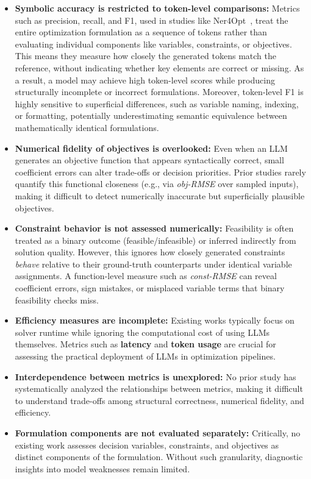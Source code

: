 \documentclass[review,12pt]{elsarticle}
\begin{document}
\begin{itemize}
    \item \textbf{Symbolic accuracy is restricted to token-level comparisons:} Metrics such as precision, recall, and F1, used in studies like Ner4Opt~\cite{kadiouglu2024ner4opt}, treat the entire optimization formulation as a sequence of tokens rather than evaluating individual components like variables, constraints, or objectives. This means they measure how closely the generated tokens match the reference, without indicating whether key elements are correct or missing. As a result, a model may achieve high token-level scores while producing structurally incomplete or incorrect formulations. Moreover, token-level F1 is highly sensitive to superficial differences, such as variable naming, indexing, or formatting, potentially underestimating semantic equivalence between mathematically identical formulations.
\vspace{-3mm}
    \item \textbf{Numerical fidelity of objectives is overlooked:} Even when an LLM generates an objective function that appears syntactically correct, small coefficient errors can alter trade-offs or decision priorities. Prior studies rarely quantify this functional closeness (e.g., via \emph{obj-RMSE} over sampled inputs), making it difficult to detect numerically inaccurate but superficially plausible objectives.
\vspace{-3mm}
    \item \textbf{Constraint behavior is not assessed numerically:} Feasibility is often treated as a binary outcome (feasible/infeasible) or inferred indirectly from solution quality. However, this ignores how closely generated constraints \emph{behave} relative to their ground-truth counterparts under identical variable assignments. A function-level measure such as \emph{const-RMSE} can reveal coefficient errors, sign mistakes, or misplaced variable terms that binary feasibility checks miss.
\vspace{-3mm}
    \item \textbf{Efficiency measures are incomplete: } Existing works typically focus on solver runtime while ignoring the computational cost of using LLMs themselves. Metrics such as \textbf{latency} and \textbf{token usage} are crucial for assessing the practical deployment of LLMs in optimization pipelines.
\vspace{-3mm}
    \item \textbf{Interdependence between metrics is unexplored:} No prior study has systematically analyzed the relationships between metrics, making it difficult to understand trade-offs among structural correctness, numerical fidelity, and efficiency.
\vspace{-3mm}
    \item \textbf{Formulation components are not evaluated separately:} Critically, no existing work assesses decision variables, constraints, and objectives as distinct components of the formulation. Without such granularity, diagnostic insights into model weaknesses remain limited.
\end{itemize}
\end{document}
